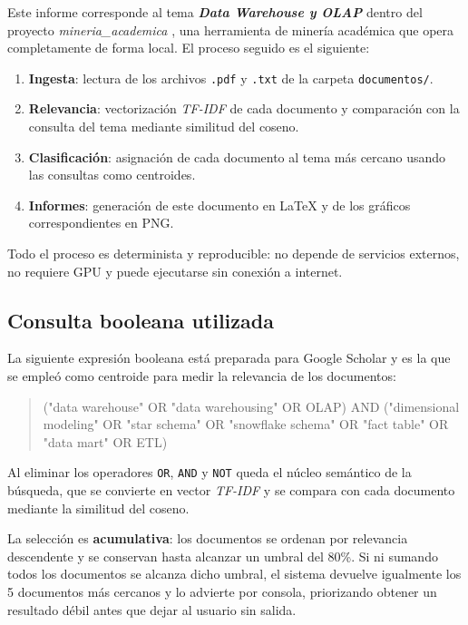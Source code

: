 \documentclass[11pt,a4paper]{article}
\newcommand{\tema}[1]{\textbf{\textit{#1}}}
\newcommand{\pcento}{\%}
\begin{document}
Este informe corresponde al tema \tema{ Data Warehouse y OLAP } dentro del
proyecto \textit{ mineria\_academica }, una herramienta de minería académica que
opera completamente de forma local. El proceso seguido es el siguiente:

\begin{enumerate}
  \item \textbf{Ingesta}: lectura de los archivos \texttt{.pdf} y
        \texttt{.txt} de la carpeta \texttt{documentos/}.
  \item \textbf{Relevancia}: vectorización \textit{TF-IDF} de cada documento
        y comparación con la consulta del tema mediante similitud del coseno.
  \item \textbf{Clasificación}: asignación de cada documento al tema más
        cercano usando las consultas como centroides.
  \item \textbf{Informes}: generación de este documento en \LaTeX{} y de los
        gráficos correspondientes en PNG.
\end{enumerate}

Todo el proceso es determinista y reproducible: no depende de servicios
externos, no requiere GPU y puede ejecutarse sin conexión a internet.

\subsection{Consulta booleana utilizada}
\label{sec:query}

La siguiente expresión booleana está preparada para Google Scholar y es la que
se empleó como centroide para medir la relevancia de los documentos:

\begin{quote}
\small\ttfamily
("data warehouse" OR "data warehousing" OR OLAP) AND ("dimensional modeling" OR "star schema" OR "snowflake schema" OR "fact table" OR "data mart" OR ETL)
\end{quote}

Al eliminar los operadores \texttt{OR}, \texttt{AND} y \texttt{NOT} queda el
núcleo semántico de la búsqueda, que se convierte en vector \textit{TF-IDF} y
se compara con cada documento mediante la similitud del coseno.

La selección es \textbf{acumulativa}: los documentos se ordenan por relevancia
descendente y se conservan hasta alcanzar un umbral del
80\pcento. Si ni sumando todos los documentos se alcanza
dicho umbral, el sistema devuelve igualmente los 5
documentos más cercanos y lo advierte por consola, priorizando obtener un
resultado débil antes que dejar al usuario sin salida.
\end{document}
